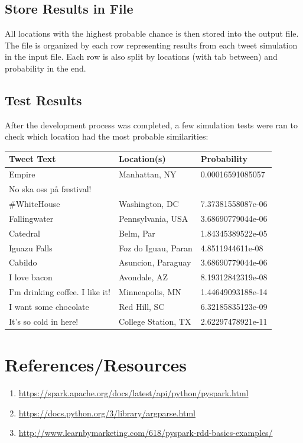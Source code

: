 \documentclass{article}
\begin{document}
\subsection*{Store Results in File}
All locations with the highest probable chance is then stored into the output file. The file is organized by each row representing results from each tweet simulation in the input file. Each row is also split by locations (with tab between) and probability in the end.

\subsection*{Test Results}
After the development process was completed, a few simulation tests were ran to check which location had the most probable similarities:
\medskip

\noindent \begin{tabular}{l|l|l}
    \textbf{Tweet Text} & \textbf{Location(s)} & \textbf{Probability} \\ \hline
    Empire & Manhattan, NY & 0.00016591085057 \\
    No ska oss på fæstival! & &  \\
    \#WhiteHouse & Washington, DC & 7.37381558087e-06 \\
    Fallingwater & Pennsylvania, USA & 3.68690779044e-06 \\
    Catedral & Belm, Par & 1.84345389522e-05 \\
    Iguazu Falls & Foz do Iguau, Paran & 4.8511944611e-08 \\
    Cabildo & Asuncion, Paraguay & 3.68690779044e-06 \\
    I love bacon & Avondale, AZ & 8.19312842319e-08 \\
    I'm drinking coffee. I like it! & Minneapolis, MN & 1.44649093188e-14 \\
    I want some chocolate & Red Hill, SC & 6.32185835123e-09 \\
    It's so cold in here! & College Station, TX & 2.62297478921e-11 \\
\end{tabular}

\vspace{1.0cm}
\section*{References/Resources}
\begin{enumerate}
    \item \url{https://spark.apache.org/docs/latest/api/python/pyspark.html}
    \item \url{https://docs.python.org/3/library/argparse.html}
    \item \url{http://www.learnbymarketing.com/618/pyspark-rdd-basics-examples/}
\end{enumerate}
\end{document}
